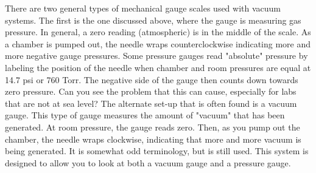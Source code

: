 There are two general types of mechanical gauge scales used with vacuum systems.  The first is the one discussed above, where the gauge is measuring gas pressure. In general, a zero reading (atmospheric) is in the middle of the scale. As a chamber is pumped out, the needle wraps counterclockwise indicating more and more negative gauge pressures. Some pressure gauges read "absolute" pressure by labeling the position of the needle when chamber and room pressures are equal at 14.7 psi or 760 Torr. The negative side of the gauge then counts down towards zero pressure. Can you see the problem that this can cause, especially for labs that are not at sea level? The alternate set-up that is often found is a vacuum gauge. This type of gauge measures the amount of "vacuum" that has been generated. At room pressure, the gauge reads zero. Then, as you pump out the chamber, the needle wraps clockwise, indicating that more and more vacuum is being generated. It is somewhat odd terminology, but is still used. This system is designed to allow you to look at both a vacuum gauge and a pressure gauge.

